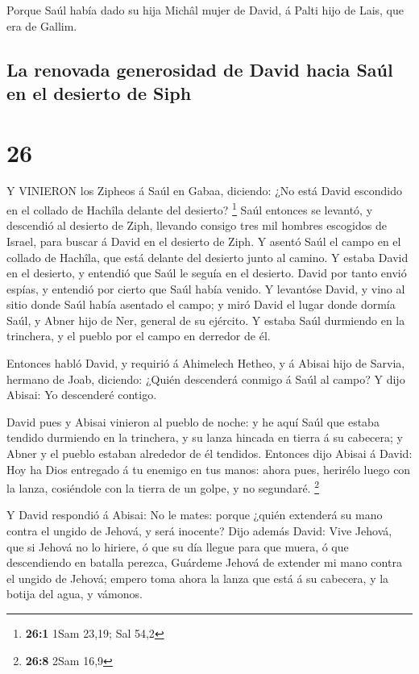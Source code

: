 Porque Saúl había dado su hija Michâl mujer de David, á
Palti hijo de Lais, que era de Gallim.

\hypertarget{la-renovada-generosidad-de-david-hacia-sauxfal-en-el-desierto-de-siph}{%
\subsection{La renovada generosidad de David hacia Saúl en el desierto
de
Siph}\label{la-renovada-generosidad-de-david-hacia-sauxfal-en-el-desierto-de-siph}}

\hypertarget{section-25}{%
\section{26}\label{section-25}}

 Y VINIERON los Zipheos á Saúl en Gabaa, diciendo: ¿No está
David escondido en el collado de Hachîla delante del desierto?
\footnote{\textbf{26:1} 1Sam 23,19; Sal 54,2}  Saúl entonces
se levantó, y descendió al desierto de Ziph, llevando consigo tres mil
hombres escogidos de Israel, para buscar á David en el desierto de Ziph.
 Y asentó Saúl el campo en el collado de Hachîla, que está
delante del desierto junto al camino. Y estaba David en el desierto, y
entendió que Saúl le seguía en el desierto.  David por tanto
envió espías, y entendió por cierto que Saúl había venido. 
Y levantóse David, y vino al sitio donde Saúl había asentado el campo; y
miró David el lugar donde dormía Saúl, y Abner hijo de Ner, general de
su ejército. Y estaba Saúl durmiendo en la trinchera, y el pueblo por el
campo en derredor de él.

 Entonces habló David, y requirió á Ahimelech Hetheo, y á
Abisai hijo de Sarvia, hermano de Joab, diciendo: ¿Quién descenderá
conmigo á Saúl al campo? Y dijo Abisai: Yo descenderé contigo.

 David pues y Abisai vinieron al pueblo de noche: y he aquí
Saúl que estaba tendido durmiendo en la trinchera, y su lanza hincada en
tierra á su cabecera; y Abner y el pueblo estaban alrededor de él
tendidos.  Entonces dijo Abisai á David: Hoy ha Dios
entregado á tu enemigo en tus manos: ahora pues, herirélo luego con la
lanza, cosiéndole con la tierra de un golpe, y no segundaré. \footnote{\textbf{26:8}
  2Sam 16,9}

 Y David respondió á Abisai: No le mates: porque ¿quién
extenderá su mano contra el ungido de Jehová, y será inocente?
 Dijo además David: Vive Jehová, que si Jehová no lo
hiriere, ó que su día llegue para que muera, ó que descendiendo en
batalla perezca,  Guárdeme Jehová de extender mi mano
contra el ungido de Jehová; empero toma ahora la lanza que está á su
cabecera, y la botija del agua, y vámonos.

